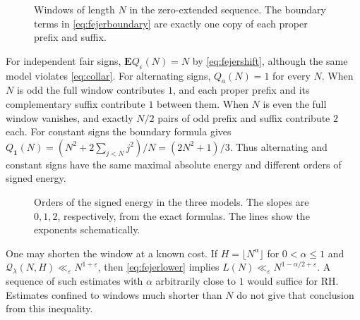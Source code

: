 \documentclass[11pt]{amsart}
\theoremstyle{definition}
\theoremstyle{remark}
\newcommand{\Q}{\mathcal Q}
\numberwithin{equation}{section}
\begin{document}
\begin{figure}[ht]
\centering
{}
\caption{Windows of length \(N\) in the zero-extended sequence. The boundary terms in \eqref{eq:fejerboundary} are exactly one copy of each proper prefix and suffix.}
\label{fig:windows}
\end{figure}

For independent fair signs, \(\mathbf E Q_\epsilon(N)=N\) by \eqref{eq:fejershift}, although the same model violates \eqref{eq:collar}. For alternating signs, \(Q_a(N)=1\) for every \(N\). When \(N\) is odd the full window contributes \(1\), and each proper prefix and its complementary suffix contribute \(1\) between them. When \(N\) is even the full window vanishes, and exactly \(N/2\) pairs of odd prefix and suffix contribute \(2\) each. For constant signs the boundary formula gives \(Q_{\mathbf 1}(N)=(N^2+2\sum_{j<N}j^2)/N=(2N^2+1)/3\). Thus alternating and constant signs have the same maximal absolute energy and different orders of signed energy.

\begin{figure}[ht]
\centering
{}
\caption{Orders of the signed energy in the three models. The slopes are \(0,1,2\), respectively, from the exact formulas. The lines show the exponents schematically.}
\label{fig:energies}
\end{figure}

One may shorten the window at a known cost. If \(H=\lfloor N^\alpha\rfloor\) for \(0<\alpha\le1\) and \(\Q_\lambda(N,H)\ll_\varepsilon N^{1+\varepsilon}\), then \eqref{eq:fejerlower} implies \(L(N)\ll_\varepsilon N^{1-\alpha/2+\varepsilon}\). A sequence of such estimates with \(\alpha\) arbitrarily close to \(1\) would suffice for RH. Estimates confined to windows much shorter than \(N\) do not give that conclusion from this inequality.
\end{document}
